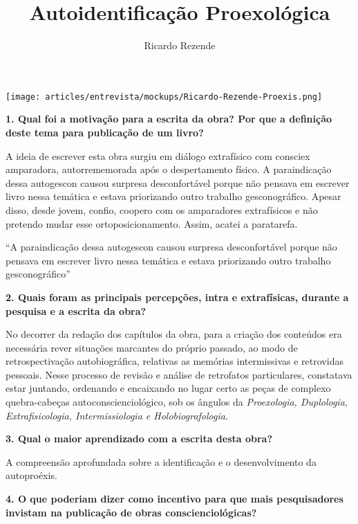 \documentclass{gescons}
\author{Ricardo Rezende}
\title{Autoidentificação Proexológica}
\begin{document}
    \makeentrevistatitle

    \begin{multicols}{2}


\begin{center}
    \texttt{[image: articles/entrevista/mockups/Ricardo-Rezende-Proexis.png]}
\end{center}

\textbf{1. Qual foi a motivação para a escrita da obra? Por que a definição deste tema para publicação de um livro? }

A ideia de escrever esta obra surgiu em diálogo extrafísico com consciex amparadora, autorrememorada após o despertamento físico. A paraindicação dessa autogescon causou surpresa desconfortável porque não pensava em escrever livro nessa temática e estava priorizando outro trabalho gesconográfico. Apesar disso, desde jovem, confio, coopero com os amparadores extrafísicos e não pretendo mudar esse ortoposicionamento. Assim, acatei a paratarefa.

\begin{pullquote}
    ``A paraindicação dessa autogescon causou surpresa desconfortável porque não pensava em escrever livro nessa temática e estava priorizando outro trabalho gesconográfico''
\end{pullquote}

\textbf{2. Quais foram as principais percepções, intra e extrafísicas, durante a pesquisa e a escrita da obra? }

No decorrer da redação dos capítulos da obra, para a criação dos conteúdos era necessária rever situações marcantes do próprio passado, ao modo de retrospectivação autobiográfica, relativas as memórias intermissivas e retrovidas pessoais. Nesse processo de revisão e análise de retrofatos particulares, constatava estar juntando, ordenando e encaixando no lugar certo as peças de complexo quebra-cabeças autoconscienciológico, sob os ângulos da \textit{Proexologia, Duplologia, Extrafisicologia, Intermissiologia e Holobiografologia}.

\textbf{3. Qual o maior aprendizado com a escrita desta obra? }

A compreensão aprofundada sobre a identificação e o desenvolvimento da autoproéxis.

\textbf{4. O que poderiam dizer como incentivo para que mais pesquisadores invistam na publicação de obras conscienciológicas?}


\end{multicols}
\end{document}
